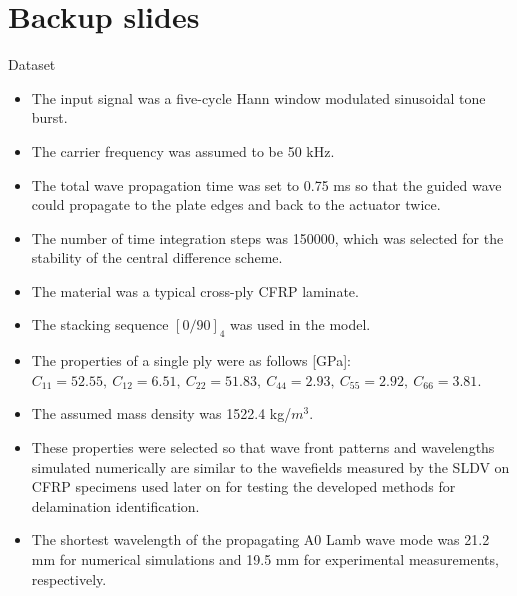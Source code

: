 \documentclass[10pt,aspectratio=169,dvipsnames]{beamer} %
\begin{document}
	\section*{Backup slides}
	\addtocounter{section}{1}
	\begin{frame}{Dataset}
		\footnotesize	
		\begin{itemize}
			\item The input signal was a five-cycle Hann window modulated sinusoidal tone burst. 
			\item The carrier frequency was assumed to be 50 kHz. 
			\item The total wave propagation time was set to 0.75 ms so that the guided wave could propagate to the plate edges and back to the actuator twice. 
			\item The number of time integration steps was 150000, which was selected for the stability of the central difference scheme.
			\item The material was a typical cross-ply CFRP laminate. 
			\item The stacking sequence \([0/90]_4\) was used in the model. 
			\item The properties of a single ply were as follows [GPa]: \(C_{11}=52.55,\ C_{12}=6.51,\ C_{22}=51.83,\ C_{44}=2.93,\ C_{55}=2.92,\ C_{66}=3.81\). 
			\item The assumed mass density was 1522.4 kg/\(m^3\). 
			\item These properties were selected so that wave front patterns and wavelengths simulated numerically are similar to the wavefields measured by the SLDV on CFRP specimens used later on for testing the developed methods for delamination identification. 
			\item The shortest wavelength of the propagating A0 Lamb wave mode was 21.2 mm for numerical simulations and 19.5 mm for experimental measurements, respectively.
		\end{itemize}		
	\end{frame}
\end{document}
